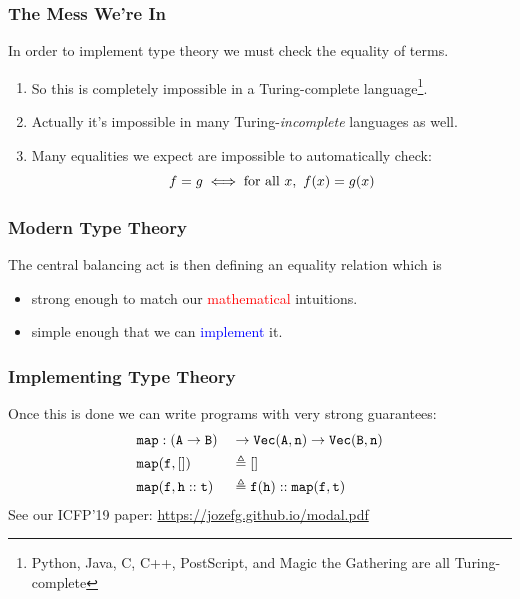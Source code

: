 \documentclass[usenames,dvipsnames,aspectratio=169,12pt]{beamer}
\begin{document}
\begin{frame}
  \frametitle{The Mess We're In}
  In order to implement type theory we must check the equality of terms.
  \begin{enumerate}
  \item So this is completely impossible in a Turing-complete language\footnote{Python, Java, C,
      C++, PostScript, and Magic the Gathering are all Turing-complete}.
  \item Actually it's impossible in many Turing-\emph{incomplete} languages as well.
  \item Many equalities we expect are impossible to automatically check:
    \[
      f = g \iff \text{for all } x,\ f(x) = g(x)
    \]
  \end{enumerate}
\end{frame}

\begin{frame}
  \frametitle{Modern Type Theory}
  The central balancing act is then defining an equality relation which is
  \begin{itemize}
  \item strong enough to match our \textcolor{Red}{mathematical} intuitions.
  \item simple enough that we can \textcolor{Blue}{implement} it.
  \end{itemize}
\end{frame}

\begin{frame}
  \frametitle{Implementing Type Theory}
  Once this is done we can write programs with very strong guarantees:
  \begin{alignat*}{2}
    &\mathtt{map} : (\mathtt{A} \to \mathtt{B}) &&\to \mathtt{Vec}(\mathtt{A}, \mathtt{n}) \to \mathtt{Vec}(\mathtt{B}, \mathtt{n})\\
    &\mathtt{map}(\mathtt{f}, []) &&\triangleq []\\
    &\mathtt{map}(\mathtt{f}, \mathtt{h} :: \mathtt{t}) &&\triangleq \mathtt{f}(\mathtt{h}) :: \mathtt{map}(\mathtt{f}, \mathtt{t})
  \end{alignat*}
  See our ICFP'19 paper: \url{https://jozefg.github.io/modal.pdf}
\end{frame}


\end{document}
